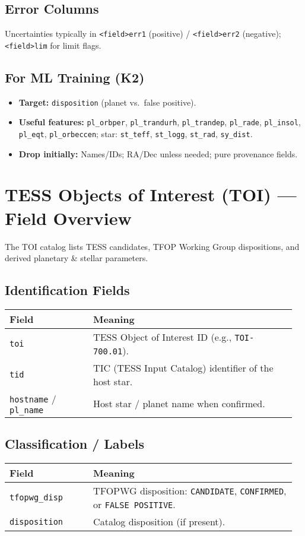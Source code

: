 \documentclass{article}
\begin{document}
\subsection*{Error Columns}
Uncertainties typically in \texttt{<field>err1} (positive) / \texttt{<field>err2} (negative); \texttt{<field>lim} for limit flags.

\subsection*{For ML Training (K2)}
\begin{itemize}
\item \textbf{Target:} \texttt{disposition} (planet vs.\ false positive).
\item \textbf{Useful features:} \texttt{pl\_orbper}, \texttt{pl\_trandurh}, \texttt{pl\_trandep}, \texttt{pl\_rade}, \texttt{pl\_insol}, \texttt{pl\_eqt}, \texttt{pl\_orbeccen}; star: \texttt{st\_teff}, \texttt{st\_logg}, \texttt{st\_rad}, \texttt{sy\_dist}.
\item \textbf{Drop initially:} Names/IDs; RA/Dec unless needed; pure provenance fields.
\end{itemize}

\section*{TESS Objects of Interest (TOI) --- Field Overview}

The TOI catalog lists TESS candidates, TFOP Working Group dispositions, and derived planetary \& stellar parameters.

\subsection*{Identification Fields}
\begin{tabular}{@{}p{0.28\linewidth} p{0.68\linewidth}@{}}
\toprule
\textbf{Field} & \textbf{Meaning} \\ \midrule
\texttt{toi} & TESS Object of Interest ID (e.g., \texttt{TOI-700.01}). \\
\texttt{tid} & TIC (TESS Input Catalog) identifier of the host star. \\
\texttt{hostname} / \texttt{pl\_name} & Host star / planet name when confirmed. \\
\bottomrule
\end{tabular}

\subsection*{Classification / Labels}
\begin{tabular}{@{}p{0.28\linewidth} p{0.68\linewidth}@{}}
\toprule
\textbf{Field} & \textbf{Meaning} \\ \midrule
\texttt{tfopwg\_disp} & TFOPWG disposition: \texttt{CANDIDATE}, \texttt{CONFIRMED}, or \texttt{FALSE POSITIVE}. \\
\texttt{disposition} & Catalog disposition (if present). \\
\bottomrule
\end{tabular}
\end{document}
